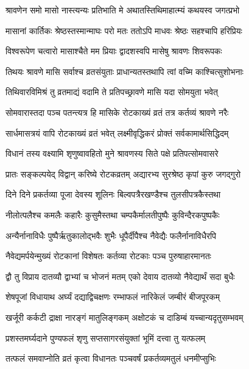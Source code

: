 \twolineshloka
{श्रावणेन समो मासो नास्त्यन्यः प्रतिभाति मे}
{अथातस्तिथिमाहात्म्यं कथयस्व जगत्प्रभो} %


\twolineshloka
{मासानां कार्तिकः श्रेष्ठस्तस्मान्माघः परो मतः}
{ततोऽपि माधवः श्रेष्ठः सहश्चापि हरिप्रियः} %

\twolineshloka
{विश्वरूपेण चत्वारो मासाश्चैते मम प्रियाः}
{द्वादशस्वपि मासेषु श्रावणः शिवरूपकः} %

\twolineshloka
{तिथयः श्रावणे मासि सर्वाश्च व्रतसंयुताः}
{प्राधान्यतस्तथापि त्वां वच्मि काश्चित्सुशोभनाः} %

\twolineshloka
{तिथिवारविमिश्रं तु व्रतमाद्यं वदामि ते}
{प्रतिपच्छ्रावणे मासि यदा सोमयुता भवेत्} %

\twolineshloka
{सोमवारास्तदा पञ्च पतन्त्यत्र हि मासिके}
{रोटकाख्यं व्रतं तत्र कर्तव्यं श्रावणे नरैः} %

\twolineshloka
{सार्धमासत्रयं वापि रोटकाख्यं व्रतं भवेत्}
{लक्ष्मीवृद्धिकरं प्रोक्तं सर्वकामार्थसिद्धिदम्} %

\twolineshloka
{विधानं तस्य वक्ष्यामि शृणुष्वावहितो मुने}
{श्रावणस्य सिते पक्षे प्रतिपत्सोमवासरे} %

\twolineshloka
{प्रातः सङ्कल्पयेद् विद्वान् करिष्ये रोटकव्रतम्}
{अद्यारभ्य सुरश्रेष्ठ कृपां कुरु जगद्गुरो} %

\twolineshloka
{दिने दिने प्रकर्तव्या पूजा देवस्य शूलिनः}
{बिल्वपत्रैरखण्डैश्च तुलसीपत्रकैस्तथा} %

\twolineshloka
{नीलोत्पलैश्च कमलैः कहारैः कुसुमैस्तथा}
{चम्पकैर्मालतीपुष्पैः कुविन्दैरकपुष्पकैः} %

\twolineshloka
{अन्यैर्नानाविधैः पुष्पैर्ऋतुकालोद्भवैः शुभैः}
{धूपैर्दीपैश्च नैवेद्यैः फलैर्नानाविधैरपि} %

\twolineshloka
{नैवेद्यमर्पयेन्मुख्यं रोटकानां विशेषतः}
{कर्तव्या रोटकाः पञ्च पुरुषाहारमानतः} %

\twolineshloka
{द्वौ तु विप्राय दातव्यौ द्वाभ्यां च भोजनं मतम्}
{एको देवाय दातव्यो नैवेद्यार्थं सदा बुधैः} %

\twolineshloka
{शेषपूजां विधायाथ अर्घ्यं दद्याद्विचक्षणः}
{रम्भाफलं नारिकेलं जम्बीरं बीजपूरकम्} %

\twolineshloka
{खर्जूरी कर्कटी द्राक्षा नारङ्गं मातुलिङ्गकम्}
{अक्षोटकं च दाडिम्बं यच्चान्यदृतुसम्भवम्} %

\twolineshloka
{प्रशस्तमर्घ्यदाने पुण्यफलं शृणु}
{सप्तसागरसंयुक्तां भूमिं दत्त्वा तु यत्फलम्} %

\twolineshloka
{तत्फलं समवाप्नोति व्रतं कृत्वा विधानतः}
{पञ्चवर्षं प्रकर्तव्यमतुलं धनमीप्सुभिः} %

